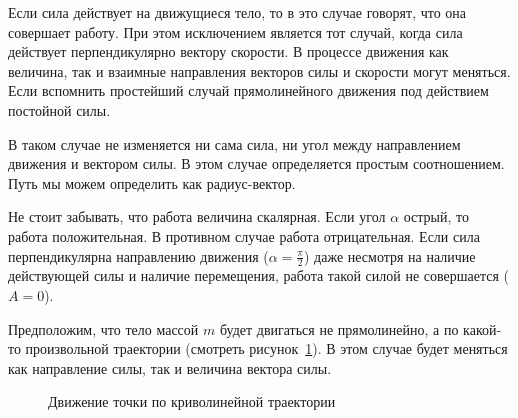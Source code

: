 Если сила действует на движущиеся тело, то в это случае говорят, что она
совершает работу. При этом исключением является тот случай, когда сила
действует перпендикулярно вектору скорости. В процессе движения как величина,
так и взаимные направления векторов силы и скорости могут меняться. Если
вспомнить простейший случай прямолинейного движения под действием постойной
силы.

\begin{figure}[!htbp]
  \begin{center}
  \end{center}
\end{figure}

В таком случае не изменяется ни сама сила, ни угол между направлением движения
и вектором силы. В этом случае определяется простым соотношением. Путь мы можем
определить как радиус-вектор.

Не стоит забывать, что работа величина скалярная. Если угол $\alpha$ острый, то
работа положительная. В противном случае работа отрицательная. Если сила
перпендикулярна направлению движения ($\alpha = \frac{\pi}{2}$) даже несмотря
на наличие действующей силы и наличие перемещения, работа такой силой не
совершается ($A = 0$).

Предположим, что тело массой $m$ будет двигаться не прямолинейно, а по какой-то
произвольной траектории (смотреть рисунок~\ref{fig:move-point-by-traeck}). В
этом случае будет меняться как направление силы, так и величина вектора силы.

\begin{figure}[htpb]
  \begin{center}
  \end{center}
  \caption{Движение точки по криволинейной траектории}%
  \label{fig:move-point-by-traeck}
\end{figure}

